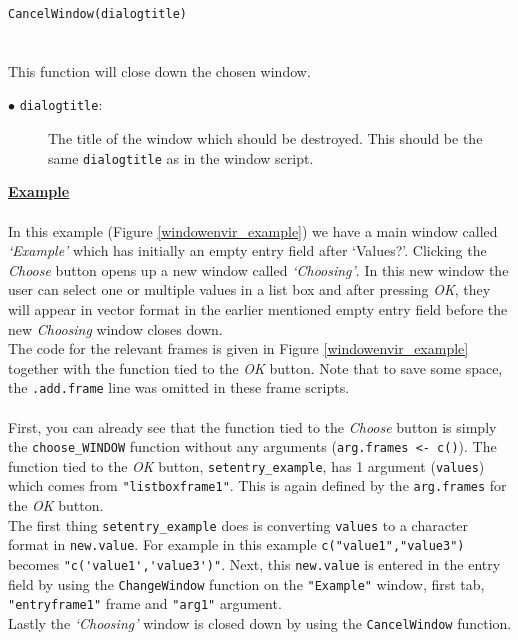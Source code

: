 \documentclass[a4paper]{article}\usepackage[]{graphicx}\usepackage[]{color}
\begin{document}
\noindent \verb|CancelWindow(dialogtitle)|
\\ \\
\\
This function will close down the chosen window.
\begin{description}
  \item[$\bullet$ \texttt{dialogtitle}:] The title of the window which should be
  destroyed. This should be the same \verb|dialogtitle| as in the window script.
   
\end{description}
{\bf \underline{Example}}
\\ \\
\noindent In this example (Figure \ref{windowenvir_example}) we have a main window called {\it `Example'} which
has initially an empty entry field after `Values?'. Clicking the {\it Choose}
button opens up a new window called {\it `Choosing'}. In this new window the
user can select one or multiple values in a list box and after pressing {\it
OK}, they will appear in vector format in the earlier mentioned empty entry
field before the new {\it Choosing} window closes down.\\
The code for the relevant frames is given in Figure \ref{windowenvir_example}
together with the function tied to the {\it OK} button. Note that to save some
space, the \verb|.add.frame| line was omitted in these frame scripts.
\\ \\
First, you can already see that the function tied to the {\it Choose} button is
simply the \verb|choose_WINDOW| function without any arguments (\verb|arg.frames <- c()|). 
The function tied to the {\it OK} button, \verb|setentry_example|, has 1
argument (\verb|values|) which comes from \verb|"listboxframe1"|. This is again
defined by the \verb|arg.frames| for the {\it OK} button. \\
The first thing \verb|setentry_example| does is converting \verb|values| to a
character format in \verb|new.value|. For example in this example
\verb|c("value1","value3")| becomes \verb|"c('value1','value3')"|. Next, this
\verb|new.value| is entered in the entry field by using the \verb|ChangeWindow|
function on the \verb|"Example"| window, first tab, \verb|"entryframe1"|
frame and \verb|"arg1"| argument.\\
Lastly the {\it `Choosing'} window is closed down by using the
\verb|CancelWindow| function.
\end{document}
